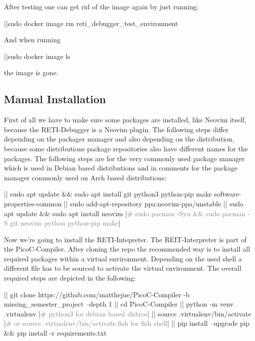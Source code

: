 \documentclass{report}
\begin{document}
After testing one can get rid of the image again by just running:

\begin{terminal}
	|\prompt|sudo docker image rm reti_debugger_test_environment
\end{terminal}

And when running

\begin{terminal}
	|\prompt|sudo docker image ls
\end{terminal}

the image is gone.

\subsection{Manual Installation}
\label{sec:manual installation}

First of all we have to make sure some packages are installed, like Neovim itself, because the RETI-Debugger is a Neovim plugin. The following steps differ depending on the packager manager and also depending on the distribution, because some distributions package repositories also have different names for the packages. The following steps are for the very commonly used package manager  which is used in Debian based distributions and in comments for the  package manager commonly used on Arch based distributions:

\begin{terminal}
  |\prompt| sudo apt update && sudo apt install git python3 python-pip make 
     software-properties-common
  |\prompt| sudo add-apt-repository ppa:neovim-ppa/unstable
  |\prompt| sudo apt update && sudo apt install neovim
  |\textcolor{gray}{# sudo pacman -Syu && sudo pacman -S git neovim python python-pip make}|
\end{terminal}

Now we're going to install the RETI-Intepreter. The REIT-Interpreter is part of the PicoC-Compiler. After cloning the repo the recommended way is to install all required packages within a \alert{virtual environment}. Depending on the used \alert{shell} a different file has to be sourced to activate the virtual environment. The overall required steps are depicted in the following:

\begin{terminal}
|\prompt| git clone https://github.com/matthejue/PicoC-Compiler
   -b missing_semester_project --depth 1
|\prompt| cd PicoC-Compiler
|\prompt| python -m venv .virtualenv |\textcolor{gray}{# python3 for debian based distros}|
|\prompt| source .virtualenv/bin/activate
|\textcolor{gray}{# or source .virtualenv/bin/activate.fish for fish shell}|
|\prompt| pip install --upgrade pip && pip install -r requirements.txt
\end{terminal}
\end{document}
